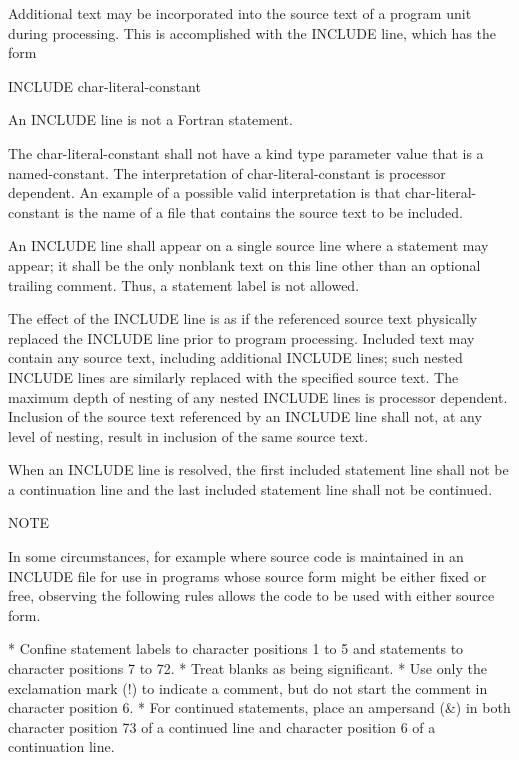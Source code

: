 Additional text may be incorporated into the source text of a program unit during processing. This is accomplished with the I\+N\+C\+L\+U\+DE line, which has the form \begin{DoxyVerb}   INCLUDE char-literal-constant
\end{DoxyVerb}


An I\+N\+C\+L\+U\+DE line is not a Fortran statement.

The char-\/literal-\/constant shall not have a kind type parameter value that is a named-\/constant. The interpretation of char-\/literal-\/constant is processor dependent. An example of a possible valid interpretation is that char-\/literal-\/constant is the name of a file that contains the source text to be included.

An I\+N\+C\+L\+U\+DE line shall appear on a single source line where a statement may appear; it shall be the only nonblank text on this line other than an optional trailing comment. Thus, a statement label is not allowed.

The effect of the I\+N\+C\+L\+U\+DE line is as if the referenced source text physically replaced the I\+N\+C\+L\+U\+DE line prior to program processing. Included text may contain any source text, including additional I\+N\+C\+L\+U\+DE lines; such nested I\+N\+C\+L\+U\+DE lines are similarly replaced with the specified source text. The maximum depth of nesting of any nested I\+N\+C\+L\+U\+DE lines is processor dependent. Inclusion of the source text referenced by an I\+N\+C\+L\+U\+DE line shall not, at any level of nesting, result in inclusion of the same source text.

When an I\+N\+C\+L\+U\+DE line is resolved, the first included statement line shall not be a continuation line and the last included statement line shall not be continued.

N\+O\+TE \begin{DoxyVerb}    In some circumstances, for example where source code is
    maintained in an INCLUDE file for use in programs whose source
    form might be either fixed or free, observing the following
    rules allows the code to be used with either source form.

    *   Confine statement labels to character positions 1 to
        5 and statements to character positions 7 to 72.
    *   Treat blanks as being significant.
    *   Use only the exclamation mark (!) to indicate
        a comment, but do not start the comment in character
        position 6.
    *   For continued statements, place an ampersand (&) in
        both character position 73 of a continued line and character
        position 6 of a continuation line.
\end{DoxyVerb}
